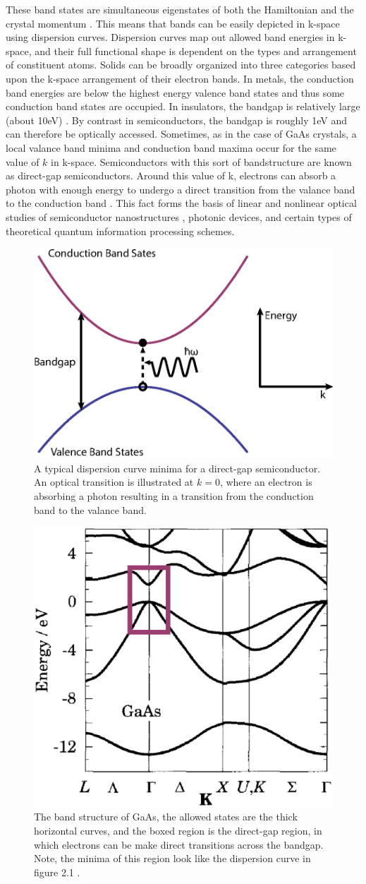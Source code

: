 \indent These band states are simultaneous eigenstates of both the Hamiltonian and the crystal momentum \cite{davies, fox}. This means that bands can be easily depicted in k-space using dispersion curves. Dispersion curves map out allowed band energies in k-space, and their full functional shape is dependent on the types and arrangement of constituent atoms.  Solids can be broadly organized into three categories based upon the k-space arrangement of their electron bands. In metals, the conduction band energies are below the highest energy valence band states and thus some conduction band states are occupied. In insulators, the bandgap is relatively large (about 10eV) \cite{fox}. By contrast in semiconductors, the bandgap is roughly 1eV and can therefore be optically accessed. Sometimes, as in the case of GaAs crystals, a local valance band minima and conduction band maxima occur for the same value of $k$ in k-space. Semiconductors with this sort of bandstructure are known as direct-gap semiconductors. Around this value of k, electrons can absorb a photon with enough energy to undergo a direct transition from the valance band to the conduction band \cite{iadonisi, galanthesis}. This fact forms the basis of linear and nonlinear optical studies of semiconductor nanostructures \cite{stevereview}, photonic devices, and certain types of theoretical quantum information processing schemes.

\begin{figure}[h]
\centering
\includegraphics[width = .4\textwidth]{dispcurve.eps}
\caption{ \doublespacing A typical dispersion curve minima for a direct-gap semiconductor. An optical transition is illustrated at $k = 0$, where an electron is absorbing a photon resulting in a transition from the conduction band to the valance band.}
\label{ExampleBands}
\end{figure}

\begin{figure}[h!]
\centering
\includegraphics[width = .3\textwidth]{GaAsBstruct.eps}
\caption{\doublespacing The band structure of GaAs, the allowed states are the thick horizontal curves, and the boxed region is the direct-gap region, in which electrons can be make direct transitions across the bandgap. Note, the minima of this region look like the dispersion curve in figure 2.1 \cite{davies}.}
\label{GaAsBstruct}
\end{figure}


